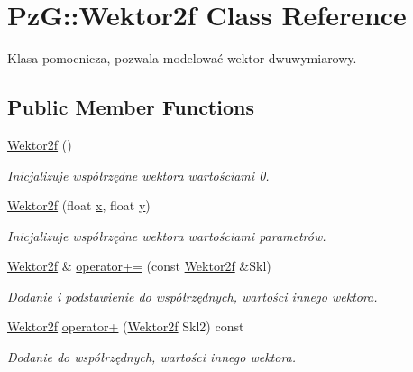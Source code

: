 \hypertarget{class_pz_g_1_1_wektor2f}{}\section{PzG\+::Wektor2f Class Reference}
\label{class_pz_g_1_1_wektor2f}


Klasa pomocnicza, pozwala modelować wektor dwuwymiarowy.  


\subsection*{Public Member Functions}
\begin{DoxyCompactItemize}
\item 
\mbox{\hyperlink{class_pz_g_1_1_wektor2f_aaf43bbf70756e10f07a79a4746f090eb}{Wektor2f}} ()
\begin{DoxyCompactList}\small\item\em Inicjalizuje współrzędne wektora wartościami 0. \end{DoxyCompactList}\item 
\mbox{\hyperlink{class_pz_g_1_1_wektor2f_a0db959de8b565cf52fe561ceaa246b5f}{Wektor2f}} (float \mbox{\hyperlink{class_pz_g_1_1_wektor2f_aacbc07ae23c748a3378c09353b0b3c4c}{x}}, float \mbox{\hyperlink{class_pz_g_1_1_wektor2f_a7bea23077e29c234ff5b9fdc4f436fb8}{y}})
\begin{DoxyCompactList}\small\item\em Inicjalizuje współrzędne wektora wartościami parametrów. \end{DoxyCompactList}\item 
\mbox{\hyperlink{class_pz_g_1_1_wektor2f}{Wektor2f}} \& \mbox{\hyperlink{class_pz_g_1_1_wektor2f_a35c467ecd7f9817d0cf3a232d50ecbcc}{operator+=}} (const \mbox{\hyperlink{class_pz_g_1_1_wektor2f}{Wektor2f}} \&Skl)
\begin{DoxyCompactList}\small\item\em Dodanie i podstawienie do współrzędnych, wartości innego wektora. \end{DoxyCompactList}\item 
\mbox{\hyperlink{class_pz_g_1_1_wektor2f}{Wektor2f}} \mbox{\hyperlink{class_pz_g_1_1_wektor2f_ab63c11faf70db9a241b99112b022226a}{operator+}} (\mbox{\hyperlink{class_pz_g_1_1_wektor2f}{Wektor2f}} Skl2) const
\begin{DoxyCompactList}\small\item\em Dodanie do współrzędnych, wartości innego wektora. \end{DoxyCompactList}\item 

\end{DoxyCompactItemize}
